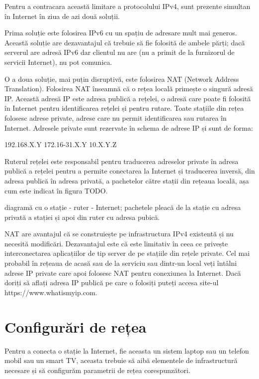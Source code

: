 Pentru a contracara această limitare a protocolului IPv4, sunt prezente simultan în Internet în ziua de azi două soluții.

Prima soluție este folosirea IPv6 cu un spațiu de adresare mult mai generos. Această soluție are dezavantajul că trebuie să fie folosită de ambele părți; dacă serverul are adresă IPv6 dar clientul nu are (nu a primit de la furnizorul de servicii Internet), nu pot comunica.

O a doua soluție, mai puțin disruptivă, este folosirea NAT (Network Address Translation). Folosirea NAT înseamnă că o rețea locală primește o singură adresă IP. Această adresă IP este adresa publică a rețelei, o adresă care poate fi folosită în Internet pentru identificarea rețelei și pentru rutare. Toate stațiile din rețea folosesc adrese private, adrese care nu permit identificarea sau rutarea în Internet. Adresele private sunt rezervate în schema de adrese IP și sunt de forma:

192.168.X.Y
172.16-31.X.Y
10.X.Y.Z

Ruterul rețelei este responsabil pentru traducerea adreselor private în adresa publică a rețelei pentru a permite conectarea la Internet și traducerea inversă, din adresa publică în adresa privată, a pachetelor către stații din rețeaua locală, așa cum este indicat în figura TODO.

diagramă cu o stație - ruter - Internet; pachetele pleacă de la stație cu adresa privată a stației și apoi din ruter cu adresa pubică.

NAT are avantajul că se construiește pe infrastructura IPv4 existentă și nu necesită modificări. Dezavantajul este că este limitativ în ceea ce privește interconectarea aplicațiilor de tip server de pe stațiile din rețele private. Cel mai probabil în rețeaua de acasă sau de la serviciu sau dintr-un local veți întâlni adrese IP private care apoi folosesc NAT pentru conexiunea la Internet. Dacă doriți să aflați adresa IP publică pe care o folosiți puteți accesa site-ul https://www.whatismyip.com.

\section{Configurări de rețea}
\label{sec:net:config}

Pentru a conecta o stație la Internet, fie aceasta un sistem laptop sau un telefon mobil sau un smart TV, aceasta trebuie să aibă elementele de infrastructură necesare și să configurăm parametrii de rețea corespunzători.

